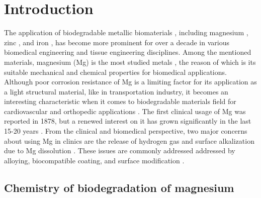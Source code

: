 \chapter{Introduction}\label{ch:introduction}



The application of biodegradable metallic biomaterials \cite{Zheng2014, Liu2019, Han2019}, including magnesium \cite{Zhao2017,Zhen2013,Willumeit-Roemer2019}, zinc \cite{Venezuela2019,Mostaed2018}, and iron \cite{Schinhammer2010}, has become more prominent for over a decade in various biomedical engineering and tissue engineering disciplines. Among the mentioned materials, magnesium (Mg) is the most studied metals \cite{Esmaily2017}, the reason of which is its suitable mechanical and chemical properties for biomedical applications. Although poor corrosion resistance of Mg is a limiting factor for its application as a light structural material, like in transportation industry, it becomes an interesting characteristic when it comes to biodegradable materials field for cardiovascular and orthopedic applications \cite{Heublein2003,Staiger2006,Walker2014}. The first clinical usage of Mg was reported in 1878, but a renewed interest on it has grown significantly in the last 15-20 years \cite{Esmaily2017}. From the clinical and biomedical perspective, two major concerns about using Mg in clinics are the release of hydrogen gas and surface alkalization due to Mg dissolution \cite{Cecchinato2015}. These issues are commonly addressed addressed by alloying, biocompatible coating, and surface modification \cite{Esmaily2017}. 


\section{Chemistry of biodegradation of magnesium}


